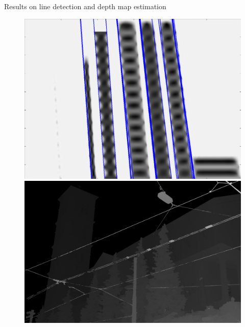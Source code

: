 \begin{frame}{Results on line detection and depth map estimation}
\begin{figure}[!tbp]
  \centering
  \begin{minipage}[b]{0.40\textwidth}
    \includegraphics[width=\textwidth]{./images/EPI-lines.png}
  \end{minipage}
	\pause
  \begin{minipage}[b]{0.40\textwidth}
    \includegraphics[width=\textwidth]{./images/dmap.png}
  \end{minipage}
\end{figure}
\end{frame}


